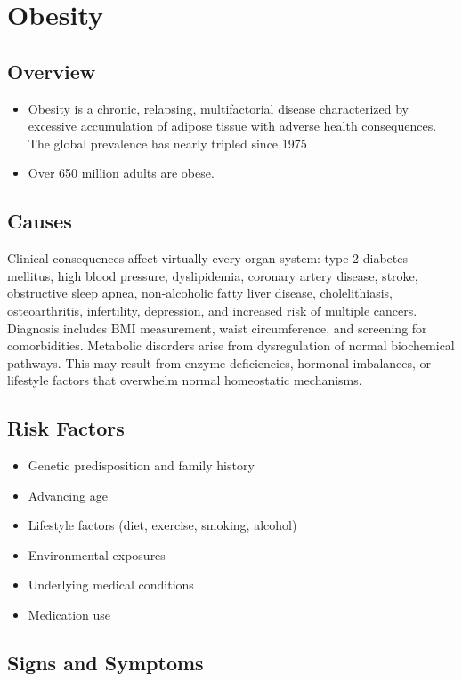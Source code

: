 \chapter{Obesity}
\label{sec:Obesity}

\section{Overview}


\begin{itemize}[noitemsep]
  \item Obesity is a chronic, relapsing, multifactorial disease characterized by excessive accumulation of adipose tissue with adverse health consequences. The global prevalence has nearly tripled since 1975
  \item Over 650 million adults are obese.
\end{itemize}
\section{Causes}
Clinical consequences affect virtually every organ system: type 2 diabetes mellitus, high blood pressure, dyslipidemia, coronary artery disease, stroke, obstructive sleep apnea, non-alcoholic fatty liver disease, cholelithiasis, osteoarthritis, infertility, depression, and increased risk of multiple cancers. Diagnosis includes BMI measurement, waist circumference, and screening for comorbidities. Metabolic disorders arise from dysregulation of normal biochemical pathways. This may result from enzyme deficiencies, hormonal imbalances, or lifestyle factors that overwhelm normal homeostatic mechanisms.   
\section{Risk Factors}
\begin{itemize}[noitemsep]
  \item Genetic predisposition and family history
  \item Advancing age
  \item Lifestyle factors (diet, exercise, smoking, alcohol)
  \item Environmental exposures
  \item Underlying medical conditions
  \item Medication use
\end{itemize}
\section{Signs and Symptoms}
